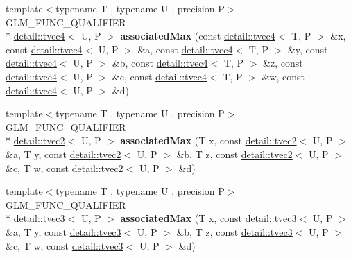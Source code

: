 \begin{DoxyCompactItemize}
\item 
\hypertarget{namespaceglm_aa9c28699144939e12f1b1261b1939688}{{\footnotesize template$<$typename T , typename U , precision P$>$ }\\G\-L\-M\-\_\-\-F\-U\-N\-C\-\_\-\-Q\-U\-A\-L\-I\-F\-I\-E\-R \\*
\hyperlink{structglm_1_1detail_1_1tvec4}{detail\-::tvec4}$<$ U, P $>$ {\bfseries associated\-Max} (const \hyperlink{structglm_1_1detail_1_1tvec4}{detail\-::tvec4}$<$ T, P $>$ \&x, const \hyperlink{structglm_1_1detail_1_1tvec4}{detail\-::tvec4}$<$ U, P $>$ \&a, const \hyperlink{structglm_1_1detail_1_1tvec4}{detail\-::tvec4}$<$ T, P $>$ \&y, const \hyperlink{structglm_1_1detail_1_1tvec4}{detail\-::tvec4}$<$ U, P $>$ \&b, const \hyperlink{structglm_1_1detail_1_1tvec4}{detail\-::tvec4}$<$ T, P $>$ \&z, const \hyperlink{structglm_1_1detail_1_1tvec4}{detail\-::tvec4}$<$ U, P $>$ \&c, const \hyperlink{structglm_1_1detail_1_1tvec4}{detail\-::tvec4}$<$ T, P $>$ \&w, const \hyperlink{structglm_1_1detail_1_1tvec4}{detail\-::tvec4}$<$ U, P $>$ \&d)}\label{namespaceglm_aa9c28699144939e12f1b1261b1939688}

\item 
\hypertarget{namespaceglm_aaa37fcc1597ced974a35c9765128c888}{{\footnotesize template$<$typename T , typename U , precision P$>$ }\\G\-L\-M\-\_\-\-F\-U\-N\-C\-\_\-\-Q\-U\-A\-L\-I\-F\-I\-E\-R \\*
\hyperlink{structglm_1_1detail_1_1tvec2}{detail\-::tvec2}$<$ U, P $>$ {\bfseries associated\-Max} (T x, const \hyperlink{structglm_1_1detail_1_1tvec2}{detail\-::tvec2}$<$ U, P $>$ \&a, T y, const \hyperlink{structglm_1_1detail_1_1tvec2}{detail\-::tvec2}$<$ U, P $>$ \&b, T z, const \hyperlink{structglm_1_1detail_1_1tvec2}{detail\-::tvec2}$<$ U, P $>$ \&c, T w, const \hyperlink{structglm_1_1detail_1_1tvec2}{detail\-::tvec2}$<$ U, P $>$ \&d)}\label{namespaceglm_aaa37fcc1597ced974a35c9765128c888}

\item 
\hypertarget{namespaceglm_a92b6d5f6dedb0372fb0fb6fbff888671}{{\footnotesize template$<$typename T , typename U , precision P$>$ }\\G\-L\-M\-\_\-\-F\-U\-N\-C\-\_\-\-Q\-U\-A\-L\-I\-F\-I\-E\-R \\*
\hyperlink{structglm_1_1detail_1_1tvec3}{detail\-::tvec3}$<$ U, P $>$ {\bfseries associated\-Max} (T x, const \hyperlink{structglm_1_1detail_1_1tvec3}{detail\-::tvec3}$<$ U, P $>$ \&a, T y, const \hyperlink{structglm_1_1detail_1_1tvec3}{detail\-::tvec3}$<$ U, P $>$ \&b, T z, const \hyperlink{structglm_1_1detail_1_1tvec3}{detail\-::tvec3}$<$ U, P $>$ \&c, T w, const \hyperlink{structglm_1_1detail_1_1tvec3}{detail\-::tvec3}$<$ U, P $>$ \&d)}\label{namespaceglm_a92b6d5f6dedb0372fb0fb6fbff888671}


\end{DoxyCompactItemize}
